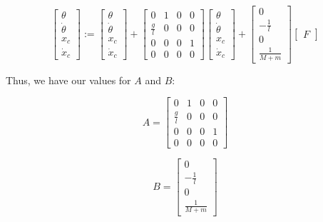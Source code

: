 \documentclass[12pt]{article}
\begin{document}
\begin{equation}
    \displaystyle
    \begin{bmatrix}
        \theta \\
        \dot \theta \\
        x _c \\
        \dot x _c
    \end{bmatrix}
    := \begin{bmatrix}
        \theta \\
        \dot \theta \\
        x _c \\
        \dot x _c
    \end{bmatrix}
    + \begin{bmatrix}
        0 & 1 & 0 & 0 \\
        \frac{g}{l} & 0 & 0 & 0 \\
        0 & 0 & 0 & 1 \\
        0 & 0 & 0 & 0
    \end{bmatrix}
    \begin{bmatrix}
        \theta \\
        \dot \theta \\
        x _c \\
        \dot x _c
    \end{bmatrix}
    + \begin{bmatrix}
        0 \\
        - \frac{1}{l} \\
        0 \\
        \frac{1}{M + m}
    \end{bmatrix}
    \begin{bmatrix}
        F
    \end{bmatrix}
\end{equation}

Thus, we have our values for $A$ and $B$:

\begin{equation}
    \displaystyle A = \begin{bmatrix}
        0 & 1 & 0 & 0 \\
        \frac{g}{l} & 0 & 0 & 0 \\
        0 & 0 & 0 & 1 \\
        0 & 0 & 0 & 0
    \end{bmatrix}
\end{equation}

\begin{equation}
    \displaystyle B = \begin{bmatrix}
        0 \\
        - \frac{1}{l} \\
        0 \\
        \frac{1}{M + m}
    \end{bmatrix}
\end{equation}
\end{document}
